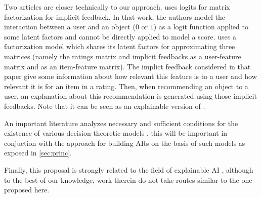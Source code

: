 \documentclass[version=3.21, pagesize, twoside=off, bibliography=totoc, DIV=calc, fontsize=12pt, a4paper, french, english]{scrartcl}
\begin{document}
Two articles are closer technically to our approach.
\citet{johnson_logistic_2014} uses logits for matrix factorization for implicit feedback. In that work, the authors model the interaction between a user and an object ($0$ or $1$) as a logit function applied to some latent factors and cannot be directly applied to model a score. \citet{zhang_explicit_2014} uses a factorization model which shares its latent factors for approximating three matrices (namely the ratings matrix and implicit feedbacks as a user-feature matrix and as an item-feature matrix). The implict feedback considered in that paper give some information about how relevant this feature is to a user and how relevant it is for an item in a rating. Then, when recommending an object to a user, an explanation about this recommendation is generated using those implicit feedbacks. Note that it can be seen as an explainable version of \citet{rendle_factorization_2010}.

An important literature analyzes necessary and sufficient conditions for the existence of various decision-theoretic models \citep{krantz_foundations_1971, gonzales_additive_1996, bouyssou_consolidated_2015}, this will be important in conjuction with the approach for building \acp{AR} on the basis of such models as exposed in \cref{sec:princ}.


Finally, this proposal is strongly related to the field of explainable AI \citep{DBLP:journals/corr/abs-1804-11192}, although to the best of our knowledge, work therein do not take routes similar to the one proposed here.
\end{document}
